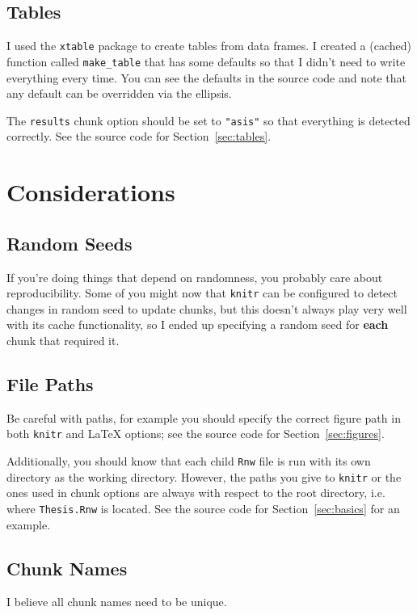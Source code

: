 \subsection{Tables}

I used the \texttt{xtable} package to create tables from data frames. I created a (cached) function called \texttt{make\_table} that has some defaults so that I didn't need to write everything every time. You can see the defaults in the source code and note that any default can be overridden via the ellipsis.

The \texttt{results} chunk option should be set to \texttt{"asis"} so that everything is detected correctly. See the source code for Section~\ref{sec:tables}.

\section{Considerations}
\label{sec:considerations}

\subsection{Random Seeds}

If you're doing things that depend on randomness, you probably care about reproducibility. Some of you might now that \texttt{knitr} can be configured to detect changes in random seed to update chunks, but this doesn't always play very well with its cache functionality, so I ended up specifying a random seed for \textbf{each} chunk that required it.

\subsection{File Paths}

Be careful with paths, for example you should specify the correct figure path in both \texttt{knitr} and \LaTeX{} options; see the source code for Section~\ref{sec:figures}.

Additionally, you should know that each child \texttt{Rnw} file is run with its own directory as the working directory. However, the paths you give to \texttt{knitr} or the ones used in chunk options are always with respect to the root directory, i.e. where \texttt{Thesis.Rnw} is located. See the source code for Section~\ref{sec:basics} for an example.

\subsection{Chunk Names}

I believe all chunk names need to be unique.
